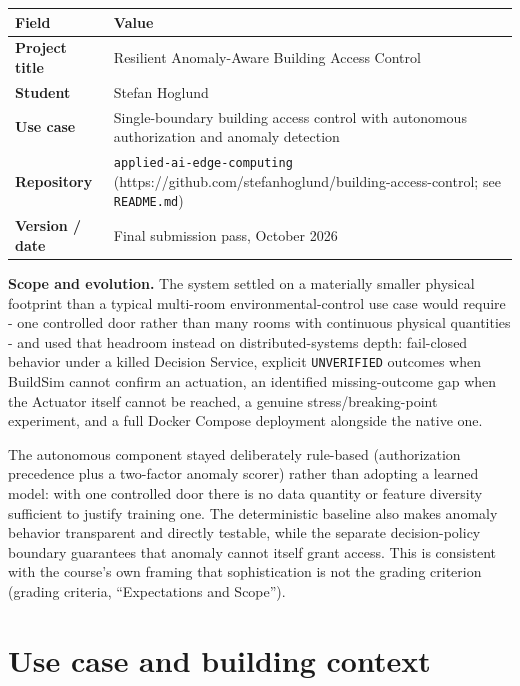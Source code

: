 \documentclass[11pt]{article}
\begin{document}
\begin{longtable}[]{@{}
  >{\raggedright\arraybackslash}p{}
  >{\raggedright\arraybackslash}p{}@{}}
\toprule
\textbf{Field} & \textbf{Value} \\
\midrule
\endhead
\textbf{Project title} & Resilient Anomaly-Aware Building Access Control \\
\textbf{Student} & Stefan Hoglund \\
\textbf{Use case} & Single-boundary building access control with autonomous authorization and anomaly detection \\
\textbf{Repository} & \texttt{applied-ai-edge-computing} (https://github.com/stefanhoglund/building-access-control; see \texttt{README.md}) \\
\textbf{Version / date} & Final submission pass, October 2026 \\
\bottomrule
\end{longtable}

\textbf{Scope and evolution.} The system settled on a materially smaller
physical footprint than a typical multi-room environmental-control use
case would require - one controlled door rather than many rooms with
continuous physical quantities - and used that headroom instead on
distributed-systems depth: fail-closed behavior under a killed Decision
Service, explicit \texttt{UNVERIFIED} outcomes when BuildSim cannot
confirm an actuation, an identified missing-outcome gap when the Actuator
itself cannot be reached, a genuine stress/breaking-point experiment,
and a full Docker Compose deployment alongside the native one.

The autonomous component stayed deliberately rule-based (authorization
precedence plus a two-factor anomaly scorer) rather than adopting a
learned model: with one controlled door there is no data quantity or
feature diversity sufficient to justify training one. The deterministic
baseline also makes anomaly behavior transparent and directly testable,
while the separate decision-policy boundary guarantees that anomaly
cannot itself grant access. This is consistent with the course's own
framing that sophistication is not the grading criterion (grading
criteria, ``Expectations and Scope'').

\section{Use case and building context}
\label{sec:usecase}
\end{document}
